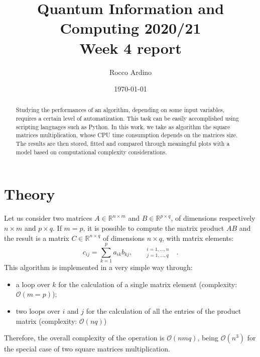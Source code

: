 \documentclass[pra, onecolumn, notitlepage, floats, 11pt]{revtex4-1}
\begin{document}
\title{Quantum Information and Computing 2020/21\\Week 4 report}

\author{Rocco Ardino}

\date{\today}





\begin{abstract}
    Studying the performances of an algorithm, depending on some input variables, requires a certain level of automatization. This task can be easily accomplished using scripting languages such as Python. In this work, we take as algorithm the square matrices multiplication, whose CPU time consumption depends on the matrices size. The results are then stored, fitted and compared through meaningful plots with a model based on computational complexity considerations.
\end{abstract}

\maketitle


\section{Theory}
Let us consider two matrices \( A \in \mathbb{R}^{n \times m} \) and \( B \in \mathbb{R}^{p \times q} \), of dimensions respectively \( n \times m \) and \( p \times q \). If \( m = p \), it is possible to compute the matrix product \( AB \) and the result is a matrix \( C \in \mathbb{R}^{n \times q} \) of dimensions \( n \times q \), with matrix elements:
\begin{equation}
    c_{ij}
    =
    \sum_{k=1}^{p} a_{ik} b_{kj},
    \qquad
    ^{i=1,\dots,n}_{j=1,\dots,q}
    \quad .
    \label{eq:03_T_MATMUL}
\end{equation}
This algorithm is implemented in a very simple way through:
\begin{itemize}
    \item a loop over \( k \) for the calculation of a single matrix element (complexity: \( \mathcal{O}(m=p) \));
    \item two loops over \( i \) and \( j \) for the calculation of all the entries of the product matrix (complexity: \( \mathcal{O}(nq) \))
\end{itemize}
Therefore, the overall complexity of the operation is \( \mathcal{O}(nmq) \), being \( \mathcal{O}(n^3) \) for the special case of two square matrices multiplication.
\end{document}
